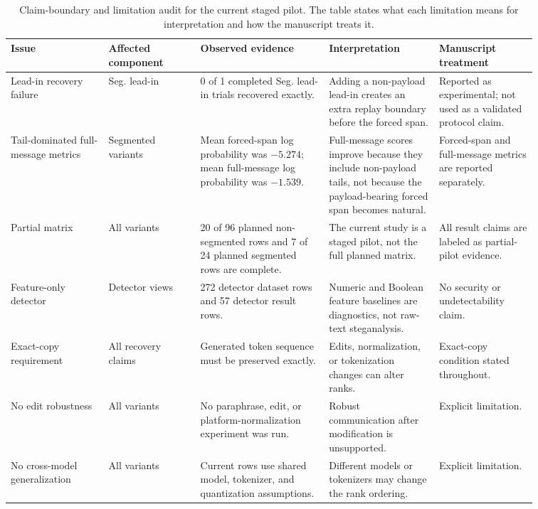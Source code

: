 \documentclass[fleqn,10pt]{wlscirep}
\begin{document}
\begin{table}[H]
\centering
\footnotesize
\setlength{\tabcolsep}{3pt}
\begin{tabular}{L{0.16\linewidth} L{0.15\linewidth} L{0.21\linewidth} L{0.18\linewidth} L{0.16\linewidth}}
\toprule
Issue & Affected component & Observed evidence & Interpretation & Manuscript treatment \\
\midrule
Lead-in recovery failure & Seg. lead-in & 0 of 1 completed Seg. lead-in trials recovered exactly. & Adding a non-payload lead-in creates an extra replay boundary before the forced span. & Reported as experimental; not used as a validated protocol claim. \\
Tail-dominated full-message metrics & Segmented variants & Mean forced-span log probability was \(-5.274\); mean full-message log probability was \(-1.539\). & Full-message scores improve because they include non-payload tails, not because the payload-bearing forced span becomes natural. & Forced-span and full-message metrics are reported separately. \\
Partial matrix & All variants & 20 of 96 planned non-segmented rows and 7 of 24 planned segmented rows are complete. & The current study is a staged pilot, not the full planned matrix. & All result claims are labeled as partial-pilot evidence. \\
Feature-only detector & Detector views & 272 detector dataset rows and 57 detector result rows. & Numeric and Boolean feature baselines are diagnostics, not raw-text steganalysis. & No security or undetectability claim. \\
Exact-copy requirement & All recovery claims & Generated token sequence must be preserved exactly. & Edits, normalization, or tokenization changes can alter ranks. & Exact-copy condition stated throughout. \\
No edit robustness & All variants & No paraphrase, edit, or platform-normalization experiment was run. & Robust communication after modification is unsupported. & Explicit limitation. \\
No cross-model generalization & All variants & Current rows use shared model, tokenizer, and quantization assumptions. & Different models or tokenizers may change the rank ordering. & Explicit limitation. \\
\bottomrule
\end{tabular}
\caption{\label{tab:s2}Claim-boundary and limitation audit for the current staged pilot. The table states what each limitation means for interpretation and how the manuscript treats it.}
\end{table}
\end{document}
